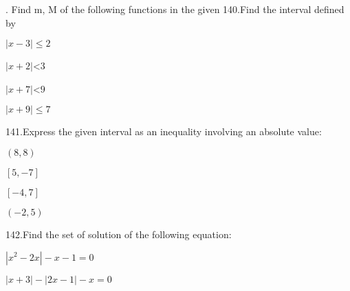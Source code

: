 \documentclass[11pt]{amsbook}
\begin{document}
%

. Find m, M of the following functions in the given
140.Find the interval defined by \\

\begin{hEnumerateAlpha}
\item $|x-3|\leqslant 2$
\item $|x+2| $<$ 3$
\item $|x+7| $<$ 9$
\item $|x+9| \leqslant 7$
\end{hEnumerateAlpha}


141.Express the given interval as an inequality involving an absolute value:\\

\begin{hEnumerateAlpha}
\item $(8,8)$
\item $[5,-7]$
\item $[-4,7]$
\item $(-2,5)$
\end{hEnumerateAlpha}


142.Find the set of solution of the following equation:\\

\begin{hEnumerateAlpha}
\item $|x^2-2x|-x-1=0$
\item $|x+3|-|2x-1|-x=0$
\end{hEnumerateAlpha}
\end{document}
